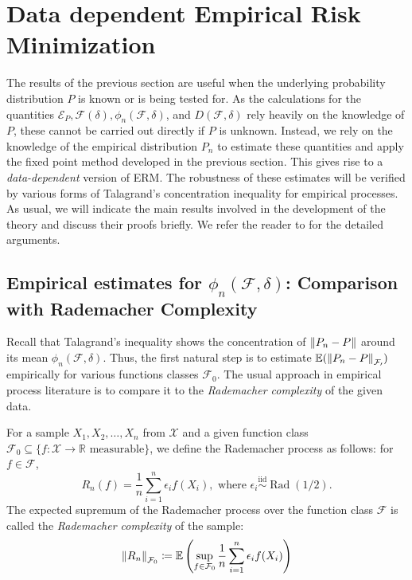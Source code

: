 \section{Data dependent Empirical Risk Minimization}\label{sec:data_ERM}

The results of the previous section are useful when the underlying probability distribution $P$ is known or is being tested for. As the calculations for the quantities $\mathcal{E}_P, \mathcal{F}(\delta), \phi_n(\mathcal{F}, \delta)$, and $D(\mathcal{F}, \delta)$ rely heavily on the knowledge of $P$, these cannot be carried out directly if $P$ is unknown. Instead, we rely on the knowledge of the empirical distribution $P_n$ to estimate these quantities and apply the fixed point method developed in the previous section. This gives rise to a \emph{data-dependent} version of ERM. The robustness of these estimates will be verified by various forms of Talagrand's concentration inequality for empirical processes. As usual, we will indicate the main results involved in the development of the theory and discuss their proofs briefly. We refer the reader to \cite[Chapter~4]{koltchinskii2008} for the detailed arguments.

\subsection{Empirical estimates for \texorpdfstring{$\phi_{n}(\mathcal{F}, \delta)$}{φ\_n(F,δ)}: Comparison with Rademacher Complexity}

Recall that Talagrand's inequality shows the concentration of $\norm{P_n - P}$ around its mean $\phi_n(\mathcal{F}, \delta)$. Thus, the first natural step is to estimate $\mathbb{E}(\norm{P_n - P}_{\mathcal{F_0}})$ empirically for various functions classes $\mathcal{F_0}$. The usual approach in empirical process literature is to compare it to the \emph{Rademacher complexity} of the given data.

\begin{definition}
  For a sample $X_1, X_2, \dots, X_n$ from $\mathcal{X}$ and a given function class $\mathcal{F}_0 \subseteq \{f: \mathcal{X} \to \mathbb{R} \text{ measurable}\}$, we define the Rademacher process as follows: for $f \in \mathcal{F}$,
  \[
    R_n(f) = \frac{1}{n}\sum_{i=1}^n \epsilon_i f(X_i), \text{ where } \epsilon_i \overset{\operatorname{iid}}{\sim } \operatorname{Rad}(1/2).
  \]
  The expected supremum of the Rademacher process over the function class $\mathcal{F}$ is called the \emph{Rademacher complexity} of the sample:
  \[
    \norm{R_n}_{\mathcal{F}_0} \coloneqq \mathbb{E}\left(\sup_{f \in \mathcal{F}_0}\frac{1}{n}\sum_{i=1}^n \epsilon_i f(X_i)\right)
  \]
\end{definition}


